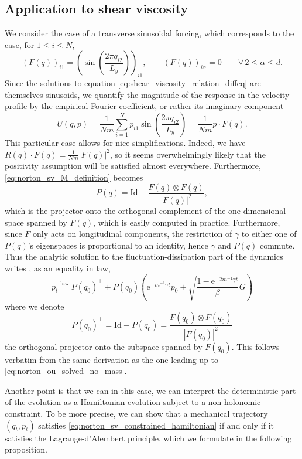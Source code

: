 \documentclass[a4paper,10pt,twoside,leqno]{report}
\newcommand{\Id}{\mathrm{Id}}
\renewcommand{\leq}{\leqslant}
\newcommand{\1}{\mathbbm{1}}
\newcommand{\e}{\mathrm{e}}
\begin{document}
    \subsection{Application to shear viscosity}
    We consider the case of a transverse sinusoidal forcing, which corresponds to the case, for $1\leq i\leq N$,
    \[ \left(F(q)\right)_{i1}=\left(\sin\left(\frac{2\pi q_{i2}}{L_y}\right)\right)_{i1},\qquad \left(F(q)\right)_{i\alpha}=0\qquad\forall\,2\leq\alpha\leq d.\]
    Since the solutions to equation \eqref{eq:shear_viscosity_relation_diffeq} are themselves sinusoids, we quantify the magnitude of the response in the velocity profile by the empirical Fourier coefficient, or rather its imaginary component
    \begin{equation}
        \label{eq:norton_sv_fourier_coeff}
        U(q,p)=\frac{1}{Nm}\sum_{i=1}^Np_{i1}\sin\left(\frac{2\pi q_{i2}}{L_y}\right)=\frac1{Nm}p\cdot F(q).
    \end{equation}
    This particular case allows for nice simplifications. Indeed, we have $R(q)\cdot F(q)=\frac{1}{Nm}|F(q)|^2$, so it seems overwhelmingly likely that   the positivity assumption will be satisfied almost everywhere.
    Furthermore, \eqref{eq:norton_sv_M_definition} becomes
    \[P(q)=\Id-\frac{F(q)\otimes F(q)}{|F(q)|^2},\]
    which is the projector onto the orthogonal complement of the one-dimensional space spanned by $F(q)$, which is easily computed in practice. Furthermore, since $F$ only acts on longitudinal components, the restriction of $\gamma$ to either one of $P(q)$'s eigenspaces is proportional to an identity, hence $\gamma$ and $P(q)$ commute.
    Thus the analytic solution to the fluctuation-dissipation part of the dynamics writes , as an equality in law,
    \begin{equation}
        \label{eq:norton_sv_fd_part_solved_ii}
                p_t\overset{\mathrm{law}}{=}P(q_0)^\perp +P(q_0)\left(\e^{-m^{-1}\gamma t}p_0+\sqrt{\frac{1-\e^{-2m^{-1}\gamma t}}{\beta}}G\right)
    \end{equation}
    where we denote
    \[P(q_0)^\perp=\Id-P(q_0)=\frac{F(q_0)\otimes F(q_0)}{|F(q_0)|^2}\]
    the orthogonal projector onto the subspace spanned by $F(q_0)$. This follows verbatim from the same derivation as the one leading up to \eqref{eq:norton_ou_solved_no_mass}.
    
    Another point is that we can in this case, we can interpret the deterministic part of the evolution as a Hamiltonian evolution subject to a non-holonomic constraint.
    To be more precise, we can show that a mechanical trajectory $(q_t,p_t)$ satisfies \eqref{eq:norton_sv_constrained_hamiltonian} if and only if it satisfies the Lagrange-d'Alembert principle, which we formulate in the following proposition.
    
\end{document}
